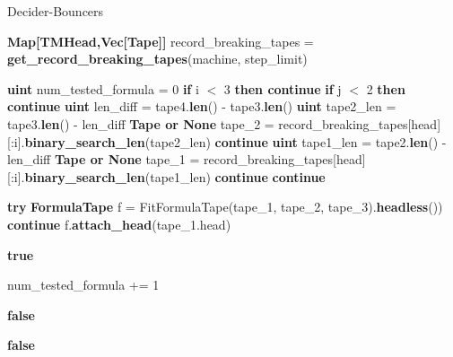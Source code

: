 \begin{algorithm}[h!]
    \caption{{\sc Decider-Bouncers}}\label{alg:decider-bouncers}
    \begin{algorithmic}[1]


        \State \textbf{Map[TMHead,Vec[Tape]]} record\_breaking\_tapes = \textbf{get\_record\_breaking\_tapes}(machine, step\_limit)

        \State \textbf{uint} num\_tested\_formula = 0
        \State \textbf{if} i $<$ 3 \textbf{then continue}
        \State \textbf{if} j $<$ 2 \textbf{then continue}
        \State \textbf{uint} len\_diff = tape4.\textbf{len}() - tape3.\textbf{len}()
        \State \textbf{uint} tape2\_len = tape3.\textbf{len}() - len\_diff
        \State \textbf{Tape or None} tape\_2 = record\_breaking\_tapes[head][:i].\textbf{binary\_search\_len}(tape2\_len)
        \State \textbf{continue}
        \EndIf
        \State
        \State \textbf{uint} tape1\_len = tape2.\textbf{len}() - len\_diff
        \State \textbf{Tape or None} tape\_1 = record\_breaking\_tapes[head][:i].\textbf{binary\_search\_len}(tape1\_len)
        \State \textbf{continue}
        \EndIf
        \State
        \State \textbf{continue}
        \EndIf

        \State

        \State \textbf{try} \textbf{FormulaTape} f = {\sc FitFormulaTape}(tape\_1, tape\_2, tape\_3).\textbf{headless}())
        \State \textbf{continue}
        \EndIf
        \State
        \State f.\textbf{attach\_head}(tape\_1.head)

        \State \Return \textbf{true}

        \EndIf

        \State
        \State num\_tested\_formula += 1

        \State
        \State \Return \textbf{false}
        \EndIf


        \EndFor
        \EndFor
        \EndFor
        \State \Return \textbf{false}
        \EndProcedure
    \end{algorithmic}
\end{algorithm}

